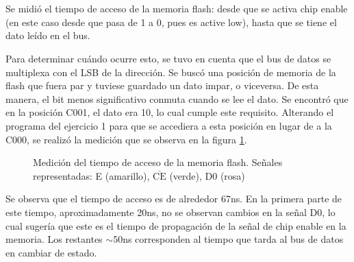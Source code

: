 \documentclass[micros_g1_main.tex]{subfiles}
\begin{document}
\section{}

Se midi\'o el tiempo de acceso de la memoria flash: desde que se activa chip enable (en este caso desde que pasa de 1 a 0, pues es active low), hasta que se tiene el dato le\'ido en el bus. 

Para determinar cu\'ando ocurre esto, se tuvo en cuenta que el bus de datos se multiplexa con el LSB de la direcci\'on. Se busc\'o una posici\'on de memoria de la flash que fuera par y tuviese guardado un dato impar, o viceversa. De esta manera, el bit menos significativo conmuta cuando se lee el dato. Se encontr\'o que en la posici\'on C001, el dato era 10, lo cual cumple este requisito. Alterando el programa del ejercicio 1 para que se accediera a esta posici\'on en lugar de a la C000, se realiz\'o la medici\'on que se observa en la figura \ref{fig:t-acceso}.

\begin{figure}[ht]
	\centering
	\caption{Medici\'on del tiempo de acceso de la memoria flash. Se\~nales representadas: E (amarillo), $\overline{\text{CE}}$ (verde), D0 (rosa)}
	\label{fig:t-acceso}
\end{figure}

Se observa que el tiempo de acceso es de alrededor 67ns. En la primera parte de este tiempo, aproximadamente 20ns, no se observan cambios en la se\~nal D0, lo cual suger\'ia que este es el tiempo de propagaci\'on de la se\~nal de chip enable en la memoria. Los restantes $\sim$50ns corresponden al tiempo que tarda al bus de datos en cambiar de estado.
\end{document}
